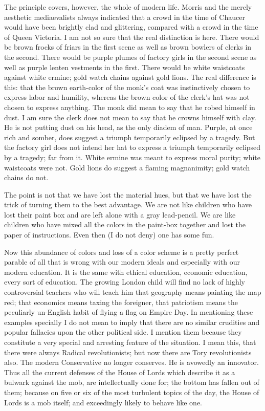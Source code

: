 \documentclass[final,10pt,letterpaper,twocolumn,openany]{book}
\begin{document}
The principle covers, however, the whole of modern life. Morris and
the merely aesthetic mediaevalists always indicated that a crowd in the
time of Chaucer would have been brightly clad and glittering, compared
with a crowd in the time of Queen Victoria. I am not so sure that the real
distinction is here. There would be brown frocks of friars in the first scene
as well as brown bowlers of clerks in the second. There would be purple
plumes of factory girls in the second scene as well as purple lenten
vestments in the first. There would be white waistcoats against white
ermine; gold watch chains against gold lions. The real difference is this:
that the brown earth-color of the monk's coat was instinctively chosen to
express labor and humility, whereas the brown color of the clerk's hat was
not chosen to express anything. The monk did mean to say that he robed
himself in dust. I am sure the clerk does not mean to say that he crowns
himself with clay. He is not putting dust on his head, as the only diadem of
man. Purple, at once rich and somber, does suggest a triumph temporarily
eclipsed by a tragedy. But the factory girl does not intend her hat to
express a triumph temporarily eclipsed by a tragedy; far from it. White
ermine was meant to express moral purity; white waistcoats were not.
Gold lions do suggest a flaming magnanimity; gold watch chains do not.

The point is not that we have lost the material hues, but that we have lost
the trick of turning them to the best advantage. We are not like children
who have lost their paint box and are left alone with a gray lead-pencil.
We are like children who have mixed all the colors in the paint-box
together and lost the paper of instructions. Even then (I do not deny) one
has some fun.

Now this abundance of colors and loss of a color scheme is a pretty
perfect parable of all that is wrong with our modern ideals and especially
with our modern education. It is the same with ethical education,
economic education, every sort of education. The growing London child
will find no lack of highly controversial teachers who will teach him that
geography means painting the map red; that economics means taxing the
foreigner, that patriotism means the peculiarly un-English habit of flying a
flag on Empire Day. In mentioning these examples specially I do not mean
to imply that there are no similar crudities and popular fallacies upon the
other political side. I mention them because they constitute a very special
and arresting feature of the situation. I mean this, that there were always
Radical revolutionists; but now there are Tory revolutionists also. The
modern Conservative no longer conserves. He is avowedly an innovator.
Thus all the current defenses of the House of Lords which describe it as a
bulwark against the mob, are intellectually done for; the bottom has fallen
out of them; because on five or six of the most turbulent topics of the day,
the House of Lords is a mob itself; and exceedingly likely to behave like
one.
\end{document}
